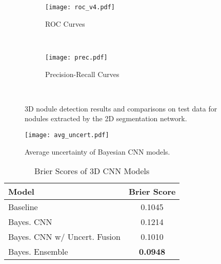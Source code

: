 \documentclass{article}
\begin{document}
\begin{figure}[h!]
	\centering
	\begin{subfigure}[b]{0.49\textwidth}
		\texttt{[image: roc\_v4.pdf]}
		\caption{ROC Curves}
		\label{fig:roc}
	\end{subfigure}
	~ %
	\begin{subfigure}[b]{0.49\textwidth}
		\texttt{[image: prec.pdf]}%
		\caption{Precision-Recall Curves}
		\label{fig:prec}
	\end{subfigure}
	~ %
	\caption{3D nodule detection results and comparisons on test data for nodules extracted by the 2D segmentation network. }\label{fig:results}
\end{figure}

\begin{figure}[h!]
	\centering
	\texttt{[image: avg\_uncert.pdf]}
	\caption{Average uncertainty of Bayesian CNN models. }\label{fig:avg_uncert}
	
\end{figure}

\begin{table}[h]
	\small
	\caption{Brier Scores of 3D CNN Models}
	\label{table:comp}
	\centering
	\begin{tabular}{lc}
		\toprule
		Model     & Brier Score \\
		\midrule
		Baseline	&   0.1045   \\
		Bayes. CNN		&   0.1214   \\
		Bayes. CNN w/ Uncert. Fusion   	& 0.1010     \\
		Bayes. Ensemble     			  & \textbf{0.0948} \\
		\bottomrule
	\end{tabular}
\end{table}
\end{document}
